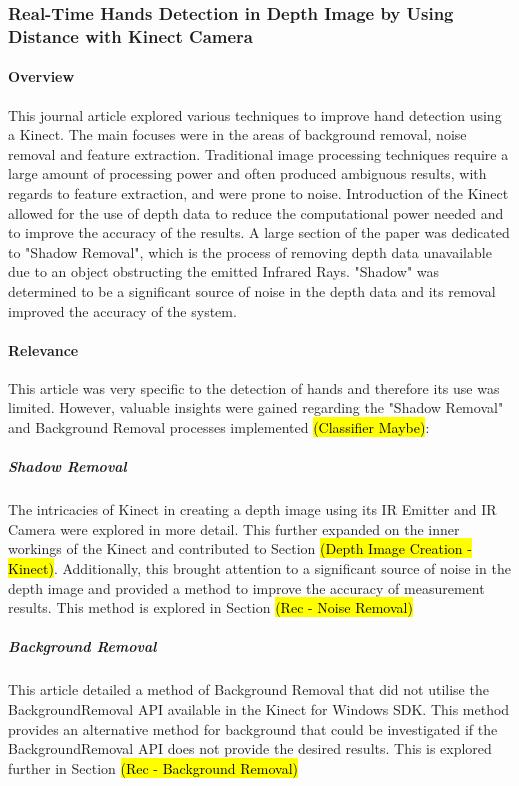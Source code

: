 \subsubsection{Real-Time Hands Detection in Depth Image by Using Distance with Kinect Camera \cite{handDetection2015}}

\paragraph{Overview}
This journal article explored various techniques to improve hand detection using a Kinect. The main focuses were in the areas of background removal, noise removal and feature extraction. Traditional image processing techniques require a large amount of processing power and often produced ambiguous results, with regards to feature extraction, and were prone to noise. Introduction of the Kinect allowed for the use of depth data to reduce the computational power needed and to improve the accuracy of the results. A large section of the paper was dedicated to "Shadow Removal", which is the process of removing depth data unavailable due to an object obstructing the emitted Infrared Rays. "Shadow" was determined to be a significant source of noise in the depth data and its removal improved the accuracy of the system.    

\paragraph{Relevance}
This article was very specific to the detection of hands and therefore its use was limited. However, valuable insights were gained regarding the "Shadow Removal" and Background Removal processes implemented \hl{(Classifier Maybe)}:

\subparagraph{Shadow Removal}
The intricacies of Kinect in creating a depth image using its IR Emitter and IR Camera were explored in more detail. This further expanded on the inner workings of the Kinect and contributed to Section \hl{(Depth Image Creation - Kinect)}. Additionally, this brought attention to a significant source of noise in the depth image and provided a method to improve the accuracy of measurement results. This method is explored in Section \hl{(Rec - Noise Removal)}

\subparagraph{Background Removal}
This article detailed a method of Background Removal that did not utilise the BackgroundRemoval API available in the Kinect for Windows SDK. This method provides an alternative method for background that could be investigated if the BackgroundRemoval API does not provide the desired results. This is explored further in Section \hl{(Rec - Background Removal)}

